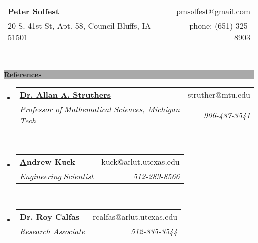 \documentclass[letterpaper,11pt]{article}
\makeatletter
\newcommand{\resheading}[1]{{\large \colorbox{darkGrey}{\color{white}\begin{minipage}{\textwidth}{\textbf{#1 \vphantom{p\^{E}}}}\end{minipage}}}}
\newcommand{\ressubheading}[4]{
      \begin{tabular*}{6.5in}{l@{\extracolsep{\fill}}r}
        \textbf{#1} & #2 \\
        \textit{#3} & \textit{#4} \\
      \end{tabular*}\vspace{-6pt}}
\makeatother
\begin{document}
    \newcommand{\mywebheader}{
      \begin{tabular*}{7in}{l@{\extracolsep{\fill}}r}
        \textbf{\LARGE Peter Solfest} & pmsolfest@gmail.com\\
	{\footnotesize 20 S. 41st St, Apt. 58, Council Bluffs, IA 51501} & phone: (651) 325-8903 \\
      \end{tabular*}
    \\
    \vspace{0.1in}}

  \mywebheader

    \resheading{References}
    \begin{itemize}
      \item
        \ressubheading{\href{http://www.mtu.edu/math/department/faculty/struthers/}{Dr. Allan A. Struthers}}{struther@mtu.edu}{Professor of Mathematical Sciences, Michigan Tech}{906-487-3541}\\[1cm]
      \item
        \ressubheading{\href{https://www.linkedin.com/in/andrewkuck/}Andrew Kuck}{kuck@arlut.utexas.edu}{Engineering Scientist}{512-289-8566}\\[1cm]
      \item
        \ressubheading{Dr. Roy Calfas}{rcalfas@arlut.utexas.edu}{Research Associate}{512-835-3544}\\[1cm]
    \end{itemize}
    
\end{document}
